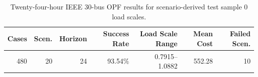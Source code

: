 \begin{table}[t]
  \centering
  \caption{Twenty-four-hour IEEE 30-bus OPF results for scenario-derived test sample 0 load scales.}
  \label{tab:case30_24h_scenario_dispatch}
  \begin{tabular}{rrrrrrr}
    \toprule
    \textbf{Cases} & \textbf{Scen.} & \textbf{Horizon} & \textbf{Success Rate} & \textbf{Load Scale Range} & \textbf{Mean Cost} & \textbf{Failed Scen.} \\
    \midrule
    480 & 20 & 24 & 93.54\% & 0.7915--1.0882 & 552.28 & 10 \\
    \bottomrule
  \end{tabular}
\end{table}
